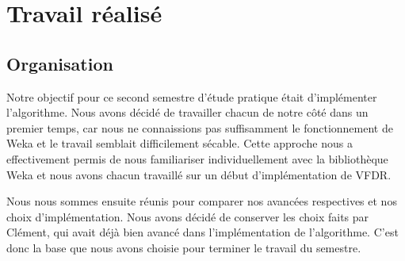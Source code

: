 \section{Travail réalisé}

    \subsection{Organisation} 

        Notre objectif pour ce second semestre d’étude pratique était d’implémenter l’algorithme. Nous avons décidé de travailler chacun de notre côté dans un premier temps, car nous ne connaissions pas suffisamment le fonctionnement de Weka et le travail semblait difficilement sécable. Cette approche nous a effectivement permis de nous familiariser individuellement avec la bibliothèque Weka et nous avons chacun travaillé sur un début d’implémentation de VFDR.

        Nous nous sommes ensuite réunis pour comparer nos avancées respectives et nos choix d’implémentation. Nous avons décidé de conserver les choix faits par Clément, qui avait déjà bien avancé dans l’implémentation de l’algorithme. C’est donc la base que nous avons choisie pour terminer le travail du semestre.

